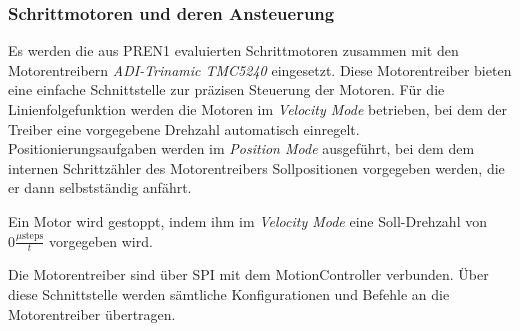 \documentclass[main.tex]{subfiles} %
\begin{document}
\subsubsection*{Schrittmotoren und deren Ansteuerung}

Es werden die aus PREN1 evaluierten Schrittmotoren zusammen mit den
Motorentreibern \textit{ADI-Trinamic TMC5240} eingesetzt. Diese Motorentreiber
bieten eine einfache Schnittstelle zur präzisen Steuerung der Motoren. Für die
Linienfolgefunktion werden die Motoren im \textit{Velocity Mode} betrieben, bei
dem der Treiber eine vorgegebene Drehzahl automatisch einregelt.
Positionierungsaufgaben werden im \textit{Position Mode} ausgeführt, bei dem
dem internen Schrittzähler des Motorentreibers Sollpositionen vorgegeben
werden, die er dann selbstständig anfährt.

Ein Motor wird gestoppt, indem ihm im \textit{Velocity Mode} eine Soll-Drehzahl
von $0 \frac{\mu \text{steps}}{t}$ vorgegeben wird.

Die Motorentreiber sind über SPI mit dem MotionController verbunden. Über diese
Schnittstelle werden sämtliche Konfigurationen und Befehle an die
Motorentreiber übertragen.

\end{document}
